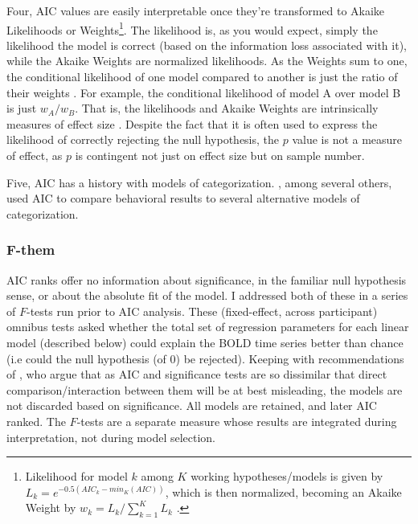 Four, AIC values are easily interpretable once they're transformed to Akaike Likelihoods or Weights\footnote{
    Likelihood for model $k$ among $K$ working hypotheses/models is given by $L_k = e^{-0.5({AIC}_k - {min}_{K}{(AIC)})}$, which is then normalized, becoming an Akaike Weight by $w_k = L_k / \sum\limits_{k=1}^K L_k$ \cite{Burnham:2004p9621}.}.  The likelihood is, as you would expect, simply the likelihood the model is correct (based on the information loss associated with it), while the Akaike Weights are normalized likelihoods.  As the Weights sum to one, the conditional likelihood of one model compared to another is just the ratio of their weights \cite{Burnham:2004p9621}.  For example, the conditional likelihood of model A over model B is just $w_A/w_B$.  That is, the likelihoods and Akaike Weights are intrinsically measures of effect size \cite{Anderson:2000p9475,Forster:2000p9623}.  Despite the fact that it is often used to express the likelihood of correctly rejecting the null hypothesis, the $p$ value is not a measure of effect, as $p$ is contingent not just on effect size but on sample number.  
    
    Five, AIC has a history with models of categorization. , among several others, used AIC to compare behavioral results to several alternative models of categorization.  

\subsubsection{F-them}
\label{subsub:F}
AIC ranks offer no information about significance, in the familiar null hypothesis sense, or about the absolute fit of the model.  I addressed both of these in a series of $F$-tests run prior to AIC analysis.  These (fixed-effect, across participant) omnibus tests asked whether the total set of regression parameters for each linear model (described below) could explain the BOLD time series better than chance (i.e could the null hypothesis (of 0) be rejected).  Keeping with recommendations of , who argue that as AIC and significance tests are so dissimilar that direct comparison/interaction between them will be at best misleading, the models are not discarded based on significance.  All models are retained, and later AIC ranked.  The $F$-tests are a separate measure whose results are integrated during interpretation, not during model selection.

